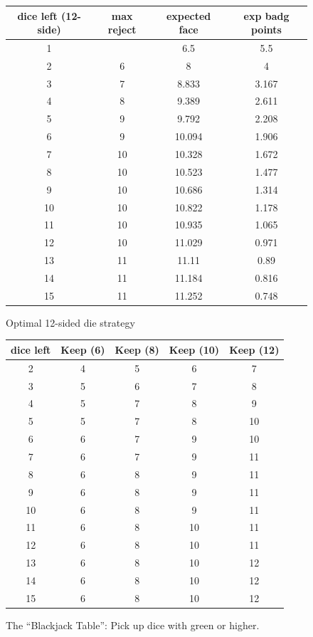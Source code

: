 \documentclass[11pt, oneside]{article} 	%
\begin{document}
\begin{figure}[!htb]
\centering
\begin{tabular}{c | c c c}
dice left (12-side) & max reject & expected face & exp badg points \\
\hline

1 &  & 6.5 & 5.5 \\
2 & \cellcolor{cyan} 6 & 8 & 4 \\
3 & \cellcolor{cyan} 7 & 8.833 & 3.167 \\
4 &\cellcolor{cyan}  8 & 9.389 & 2.611 \\
5 & 9 & 9.792 & 2.208 \\
6 & \cellcolor{cyan} 9 & 10.094 & 1.906 \\
7 & 10 & 10.328 & 1.672 \\
8 & 10 & 10.523 & 1.477 \\
9 & 10 & 10.686 & 1.314 \\
10 & 10 & 10.822 & 1.178 \\
11 & 10 & 10.935 & 1.065 \\
12 & \cellcolor{cyan} 10 & 11.029 & 0.971 \\
13 & 11 & 11.11 & 0.89 \\
14 & 11 & 11.184 & 0.816 \\
15 & 11 & 11.252 & 0.748 \\
\end{tabular}
\caption{Optimal 12-sided die strategy}
\label{fig:optimal12}
\end{figure}


\begin{figure}[!htb]
\centering
\begin{tabular}{c | c c c c }
dice left & Keep (6) & Keep (8) & Keep (10) & Keep (12) \\
\hline
2 & \cellcolor{green} 4 &  \cellcolor{green}  5 &  \cellcolor{green}  6 &  \cellcolor{green}  7\\
3 & 5 &  \cellcolor{green}  6 &  \cellcolor{green}  7 &  \cellcolor{green} 8\\
4 & 5 & 7 & 8 &  \cellcolor{green} 9 \\
5 & \cellcolor{green}  5 & 7 &  \cellcolor{green} 8 & 10 \\
6 & 6 & 7 &  9 & \cellcolor{green}  10 \\
7 & 6 &  \cellcolor{green}  7 & 9 & 11 \\
8 & 6 & 8 & 9 & 11 \\
9 & 6 & 8 & 9 & 11 \\
10 & 6 & 8 &   \cellcolor{green}  9 &  11 \\
11 & 6 & 8 &10 & 11 \\
12 & 6 & 8 &  10 & \cellcolor{green} 11 \\
13 & 6 & 8 & 10 &12 \\
14 & 6 & 8 & 10 & 12 \\
15 & 6 & 8 & 10 &  12 \\
\end{tabular}
\caption{The ``Blackjack Table'': Pick up dice with green or higher.}
\label{fig:blackjack-table}
\end{figure}
\end{document}
